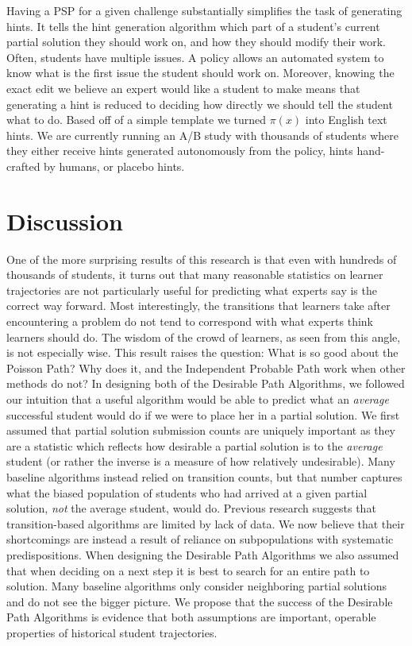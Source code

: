 Having a PSP for a given challenge substantially simplifies the task of generating hints. It tells the hint generation algorithm which part of a student's current partial solution they should work on, and how they should modify their work. Often, students have multiple issues. A policy allows an automated system to know what is the first issue the student should work on. Moreover, knowing the exact edit we believe an expert would like a student to make means that generating a hint is reduced to deciding how directly we should tell the student what to do. Based off of a simple template we turned $\pi(x)$ into English text hints. We are currently running an A/B study with thousands of students where they either receive hints generated autonomously from the policy, hints hand-crafted by humans, or placebo hints. 

\section{Discussion}

One of the more surprising results of this research is that even with hundreds of thousands of students, it turns out that many reasonable statistics on learner trajectories are not particularly useful for predicting what experts say is the correct way forward. Most interestingly, the transitions that learners take after encountering a problem do not tend to correspond with what experts think learners should do. The wisdom of the crowd of learners, as seen from this angle, is not especially wise. This result raises the question: What is so good about the Poisson Path? Why does it, and the Independent Probable Path work when other methods do not? In designing both of the Desirable Path Algorithms, we followed our intuition that a useful algorithm would be able to predict what an \emph{average} successful student would do if we were to place her in a partial solution. We first assumed that partial solution submission counts are uniquely important as they are a statistic which reflects how desirable a partial solution is to the \emph{average} student (or rather the inverse is a measure of how relatively undesirable). Many baseline algorithms instead relied on transition counts, but that number captures what the biased population of students who had arrived at a given partial solution, \emph{not} the average student, would do. Previous research suggests that transition-based algorithms are limited by lack of data. We now believe that their shortcomings are instead a result of reliance on subpopulations with systematic predispositions. When designing the Desirable Path Algorithms we also assumed that when deciding on a next step it is best to search for an entire path to solution. Many baseline algorithms only consider neighboring partial solutions and do not see the bigger picture. We propose that the success of the Desirable Path Algorithms is evidence that both assumptions are important, operable properties of historical student trajectories. 

